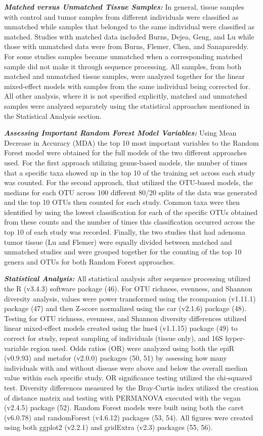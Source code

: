 \documentclass[12pt,]{article}
\begin{document}
\textbf{\emph{Matched versus Unmatched Tissue Samples:}} In general,
tissue samples with control and tumor samples from different individuals
were classified as unmatched while samples that belonged to the same
individual were classified as matched. Studies with matched data
included Burns, Dejea, Geng, and Lu while those with unmatched data were
from Burns, Flemer, Chen, and Sanapareddy. For some studies samples
became unmatched when a corresponding matched sample did not make it
through sequence processing. All samples, from both matched and
unmatched tissue samples, were analyzed together for the linear
mixed-effect models with samples from the same individual being
corrected for. All other analysis, where it is not specified explicitly,
matched and unmatched samples were analyzed separately using the
statistical approaches mentioned in the Statistical Analysis section.

\textbf{\emph{Assessing Important Random Forest Model Variables:}} Using
Mean Decrease in Accuracy (MDA) the top 10 most important variables to
the Random Forest model were obtained for the full models of the two
different approaches used. For the first approach utilizing genus-based
models, the number of times that a specific taxa showed up in the top 10
of the training set across each study was counted. For the second
approach, that utilized the OTU-based models, the medians for each OTU
across 100 different 80/20 splits of the data was generated and the top
10 OTUs then counted for each study. Common taxa were then identified by
using the lowest classification for each of the specific OTUs obtained
from these counts and the number of times this classification occurred
across the top 10 of each study was recorded. Finally, the two studies
that had adenoma tumor tissue (Lu and Flemer) were equally divided
between matched and unmatched studies and were grouped together for the
counting of the top 10 genera and OTUs for both Random Forest
approaches.

\textbf{\emph{Statistical Analysis:}} All statistical analysis after
sequence processing utilized the R (v3.4.3) software package (46). For
OTU richness, evenness, and Shannon diversity analysis, values were
power transformed using the rcompanion (v1.11.1) package (47) and then
Z-score normalized using the car (v2.1.6) package (48). Testing for OTU
richness, evenness, and Shannon diversity differences utilized linear
mixed-effect models created using the lme4 (v1.1.15) package (49) to
correct for study, repeat sampling of individuals (tissue only), and 16S
hyper-variable region used. Odds ratios (OR) were analyzed using both
the epiR (v0.9.93) and metafor (v2.0.0) packages (50, 51) by assessing
how many individuals with and without disease were above and below the
overall median value within each specific study. OR significance testing
utilized the chi-squared test. Diversity differences measured by the
Bray-Curtis index utilized the creation of distance matrix and testing
with PERMANOVA executed with the vegan (v2.4.5) package (52). Random
Forest models were built using both the caret (v6.0.78) and randomForest
(v4.6.12) packages (53, 54). All figures were created using both ggplot2
(v2.2.1) and gridExtra (v2.3) packages (55, 56).
\end{document}
